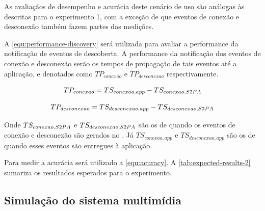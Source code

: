 As avaliaçãos de desempenho e acurácia deste cenário de uso são análogas às descritas para o experimento 1, com a exceção de que eventos de conexão e desconexão também fazem partes das medições.

A \autoref{equ:performance-discovery} será utilizada para avaliar a performance da notificação de eventos de descoberta. A performance da notificação dos eventos de conexão e desconexão serão os tempos de propagação de tais eventos até a aplicação, e denotados como $TP_{conexao}$ e $TP_{desconexao}$ respectivamente.

\begin{equation}
	\label{equ:performance-connection}
	TP_{conexao} = TS_{conexao,app} - TS_{conexao,S2PA{}}
\end{equation}

\begin{equation}
	\label{equ:performance-disconnection}
	TP_{desconexao} = TS_{desconexao,app} - TS_{desconexao,S2PA{}}
\end{equation}

Onde $TS_{conexao,S2PA{}}$ e $TS_{desconexao,S2PA{}}$ são os \timestamps{} de quando os eventos de conexão e desconexão são gerados no \stwopa{}. Já $TS_{conexao,app}$ e $TS_{desconexao,app}$ são os \timestamps{} de quando esses eventos são entregues à aplicação.

Para medir a acurácia será utilizado a \autoref{equ:acuracy}. A \autoref{tab:expected-results-2} sumariza os resultados esperados para o experimento.

\begin{table}[htb]
	\begin{center}
	\end{center}
\end{table}

\subsection{Simulação do sistema multimídia}

